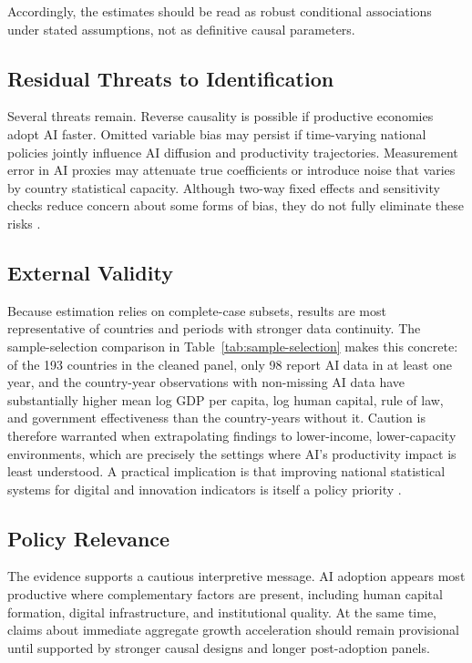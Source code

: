 Accordingly, the estimates should be read as robust conditional associations under stated assumptions, not as definitive causal parameters.

\subsection{Residual Threats to Identification}

Several threats remain. Reverse causality is possible if productive economies adopt AI faster. Omitted variable bias may persist if time-varying national policies jointly influence AI diffusion and productivity trajectories. Measurement error in AI proxies may attenuate true coefficients or introduce noise that varies by country statistical capacity. Although two-way fixed effects and sensitivity checks reduce concern about some forms of bias, they do not fully eliminate these risks \cite{wooldridge2010,wooldridge2021}.

\subsection{External Validity}

Because estimation relies on complete-case subsets, results are most representative of countries and periods with stronger data continuity. The sample-selection comparison in Table~\ref{tab:sample-selection} makes this concrete: of the 193 countries in the cleaned panel, only 98 report AI data in at least one year, and the country-year observations with non-missing AI data have substantially higher mean log GDP per capita, log human capital, rule of law, and government effectiveness than the country-years without it. Caution is therefore warranted when extrapolating findings to lower-income, lower-capacity environments, which are precisely the settings where AI's productivity impact is least understood. A practical implication is that improving national statistical systems for digital and innovation indicators is itself a policy priority \cite{worldbank2021wdr,oecd2023ai}.

\subsection{Policy Relevance}

The evidence supports a cautious interpretive message. AI adoption appears most productive where complementary factors are present, including human capital formation, digital infrastructure, and institutional quality. At the same time, claims about immediate aggregate growth acceleration should remain provisional until supported by stronger causal designs and longer post-adoption panels.

